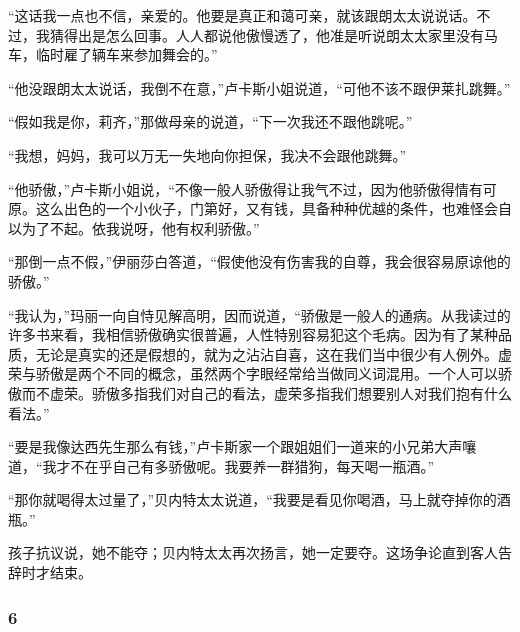 \par “这话我一点也不信，亲爱的。他要是真正和蔼可亲，就该跟朗太太说说话。不过，我猜得出是怎么回事。人人都说他傲慢透了，他准是听说朗太太家里没有马车，临时雇了辆车来参加舞会的。”
\par “他没跟朗太太说话，我倒不在意，”卢卡斯小姐说道，“可他不该不跟伊莱扎跳舞。”
\par “假如我是你，莉齐，”那做母亲的说道，“下一次我还不跟他跳呢。”
\par “我想，妈妈，我可以万无一失地向你担保，我决不会跟他跳舞。”
\par “他骄傲，”卢卡斯小姐说，“不像一般人骄傲得让我气不过，因为他骄傲得情有可原。这么出色的一个小伙子，门第好，又有钱，具备种种优越的条件，也难怪会自以为了不起。依我说呀，他有权利骄傲。”
\par “那倒一点不假，”伊丽莎白答道，“假使他没有伤害我的自尊，我会很容易原谅他的骄傲。”
\par “我认为，”玛丽一向自恃见解高明，因而说道，“骄傲是一般人的通病。从我读过的许多书来看，我相信骄傲确实很普遍，人性特别容易犯这个毛病。因为有了某种品质，无论是真实的还是假想的，就为之沾沾自喜，这在我们当中很少有人例外。虚荣与骄傲是两个不同的概念，虽然两个字眼经常给当做同义词混用。一个人可以骄傲而不虚荣。骄傲多指我们对自己的看法，虚荣多指我们想要别人对我们抱有什么看法。”
\par “要是我像达西先生那么有钱，”卢卡斯家一个跟姐姐们一道来的小兄弟大声嚷道，“我才不在乎自己有多骄傲呢。我要养一群猎狗，每天喝一瓶酒。”
\par “那你就喝得太过量了，”贝内特太太说道，“我要是看见你喝酒，马上就夺掉你的酒瓶。”
\par 孩子抗议说，她不能夺；贝内特太太再次扬言，她一定要夺。这场争论直到客人告辞时才结束。



\subsubsection*{6}

